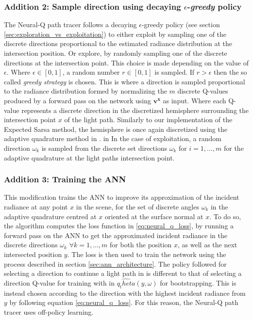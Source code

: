 \documentclass[../dissertation.tex]{subfiles}
\begin{document}
\subsubsection*{Addition 2: Sample direction using decaying $\epsilon$-\textit{greedy} policy}
The Neural-Q path tracer follows a decaying $\epsilon$-greedy policy (see section \ref{sec:exploration_vs_exploitation}) to either exploit by sampling one of the discrete directions  proportional to the estimated radiance distribution at the intersection position. Or explore, by randomly sampling one of the discrete directions at the intersection point. This choice is made depending on the value of $\epsilon$. Where $\epsilon \in [0,1]$, a random number $r \in [0,1]$ is sampled. If $r > \epsilon$ then the so called \textit{greedy strategy} is chosen. This is where a direction is sampled proportional to the radiance distribution formed by normalizing the $m$ discrete Q-values produced by a forward pass on the network using $\mathbf{v^x}$ as input. Where each Q-value represents a discrete direction in the discretized hemisphere surrounding the intersection point $x$ of the light path. Similarly to our implementation of the  Expected Sarsa method, the hemisphere is once again discretized using the adaptive quadrature method in \cite{shirley1994notes}. in In the case of exploitation, a random direction $\omega_k$ is sampled from the discrete set directions $\omega_k$ for $i = 1,...,m$ for the adaptive quadrature at the light paths intersection point. 

\subsubsection*{Addition 3: Training the ANN}
This modification trains the ANN to improve its approximation of the incident radiance at any point $x$ in the scene, for the set of discrete angles $\omega_k$ in the adaptive quadrature centred at $x$ oriented at the surface normal at $x$. To do so, the algorithm computes the loss function in \ref{eq:neural_q_loss}, by running a forward pass on the ANN to get the approximated incident radiance in the discrete directions $\omega_k$ $\forall k=1,...,m$ for both the position $x$, as well as the next intersected position $y$. The loss is then used to train the network using the process described in section \ref{sec:ann_architecture}. The policy followed for selecting a direction to continue a light path in is different to that of selecting a direction Q-value for training with in $\hat{q_theta}(y, \omega)$ for bootstrapping. This is instead chosen according to the direction with the highest incident radiance from $y$ by following equation \ref{eq:neural_q_loss}. For this reason, the Neural-Q path tracer uses off-policy learning.
\end{document}
